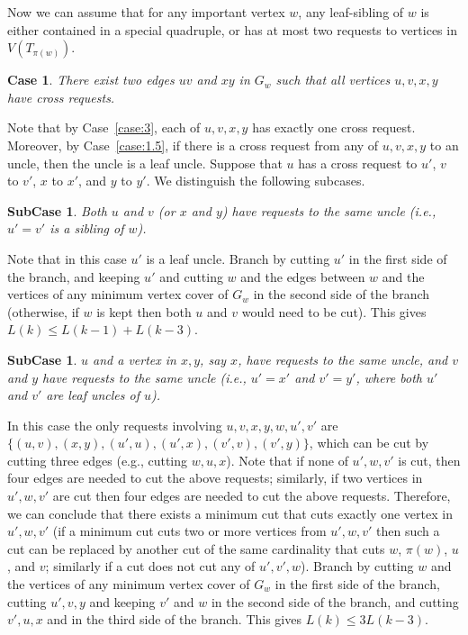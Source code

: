 \documentclass[11pt]{article}
\newtheorem{case}[theorem]{Case}
\newtheorem{subcase}[theorem]{SubCase}
\begin{document}
Now we can assume that for any important vertex $w$, any leaf-sibling of $w$ is either contained in a special quadruple, or has at most two requests to vertices in $V(T_{\pi(w)})$.


\begin{case}\label{case:7}
There exist two edges $uv$ and $xy$ in $G_w$ such that all vertices $u, v, x, y$ have cross requests.
\end{case}

Note that by Case~\ref{case:3}, each of $u, v, x, y$ has exactly one cross request. Moreover, by Case~\ref{case:1.5}, if there is a cross request from any of $u, v, x, y$ to an uncle, then the uncle is a leaf uncle.  Suppose that $u$ has a cross request to $u'$, $v$ to $v'$, $x$ to $x'$, and $y$ to $y'$. We distinguish the following subcases.

\begin{subcase}
\label{subcase:71}
Both $u$ and $v$ (or $x$ and $y$) have requests to the same uncle (i.e., $u'=v'$ is a sibling of $w$).
\end{subcase}

Note that in this case $u'$ is a leaf uncle. Branch by cutting $u'$ in the first side of the branch, and keeping $u'$ and cutting $w$ and the edges between $w$ and the vertices of any minimum vertex cover of $G_w$ in the second side of the branch (otherwise, if $w$ is kept then both $u$ and $v$ would need to be cut). This gives $L(k) \leq L(k-1) + L(k-3)$.


\begin{subcase}
\label{subcase:72}
$u$ and a vertex in $x, y$, say $x$, have requests to the same uncle, and $v$ and $y$ have requests to the same uncle (i.e., $u'=x'$ and $v'=y'$, where both $u'$ and $v'$ are leaf uncles of $u$).
\end{subcase}
In this case the only requests involving $u, v, x, y, w, u', v'$ are $\{(u, v), (x, y), (u', u), (u', x), (v', v), (v', y)\}$, which can be cut by cutting three edges (e.g., cutting $w, u, x$). Note that if none of $u', w, v'$ is cut, then four edges are needed to cut the above requests; similarly, if two vertices in $u', w, v'$ are cut then four edges are needed to cut the above requests. Therefore, we can conclude that there exists a minimum cut that cuts exactly one vertex in $u', w, v'$ (if a minimum cut cuts two or more vertices from $u', w, v'$ then such a cut can be replaced by another cut of the same cardinality that cuts $w$, $\pi(w)$, $u$, and $v$; similarly if a cut does not cut any of $u', v', w$).  Branch by cutting $w$ and the vertices of any minimum vertex cover of $G_w$ in the first side of the branch, cutting $u', v, y$ and keeping $v'$ and $w$ in the second side of the branch, and cutting $v', u, x$ and in the third side of the branch. This gives $L(k) \leq 3L(k-3)$.
\end{document}
